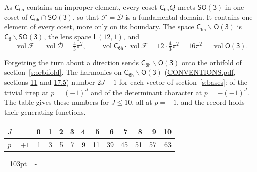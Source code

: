 \documentclass[10pt,a4paper]{article}
\newcommand{\needspace}[1]{\par\penalty-100\begingroup\dimen0=#1\relax\dimen2=\pagegoal
  \advance\dimen2-\pagetotal\ifdim\dimen0>\dimen2\relax\ifdim\dimen2>0pt\vfil\break\fi\fi
  \endgroup}
\numberwithin{equation}{section}
\newcommand{\grp}[1]{\mathsf{#1}}
\newcommand{\vol}{\operatorname{vol}}
\newcommand{\fcell}{\mathcal{D}}
\newcommand{\fdomain}{\mathcal{F}}
\newcommand{\lensspace}[2]{\mathsf{L}(#1, #2)}
\begin{document}
\leavevmode\label{n:set.fundamental}As $\grp{C_{6h}}$ contains an improper element, every coset $\grp{C_{6h}}Q$ meets \href{SO3.pdf}{$\grp{SO(3)}$} in one coset of $\grp{C_{6h}} \cap \grp{SO(3)}$, so that $\fdomain = \fcell$ is a fundamental domain. It contains one element of every coset, more only on its boundary.
\leavevmode\label{n:set.lens}The space $\grp{C_{6h}}\backslash\grp{O(3)}$ is $\grp{C_{6}}\backslash\grp{SO(3)}$, the lens space $\lensspace{12}{1}$, and
\begin{equation}\label{e:volume}\vol\fdomain = \vol\fcell = \tfrac{4}{3}\pi^2,\qquad \vol\grp{C_{6h}}\cdot\vol\fdomain = 12\cdot \tfrac{4}{3}\pi^2 = 16\pi^2 = \vol\grp{O(3)}.\end{equation}

Forgetting the turn about a direction sends $\grp{C_{6h}}\backslash\grp{O(3)}$ onto the orbifold of section~\ref{s:orbifold}.
The harmonics on $\grp{C_{6h}}\backslash\grp{O(3)}$ (\href{../../CONVENTIONS.pdf}{CONVENTIONS.pdf}, sections \href{../../CONVENTIONS.pdf\#conv.11}{11} and \href{../../CONVENTIONS.pdf\#conv.17.5}{17.5}) number $2J + 1$ for each vector of section~\ref{s:bases}: of the trivial irrep at $p = (-1)^J$ and of the determinant character at $p = -(-1)^J$. The table gives these numbers for $J \le 10$, all at $p = +1$, and the record holds their generating functions.
{\small\setlength{\tabcolsep}{4pt}\begin{longtable}{@{}lrrrrrrrrrrr@{}}\toprule
$J$ & 0 & 1 & 2 & 3 & 4 & 5 & 6 & 7 & 8 & 9 & 10\\\midrule\endhead
\bottomrule\endfoot\endlastfoot
$p = +1$ & 1 & 3 & 5 & 7 & 9 & 11 & 39 & 45 & 51 & 57 & 63\\
\bottomrule\end{longtable}}
\needspace{103pt}
\end{document}
